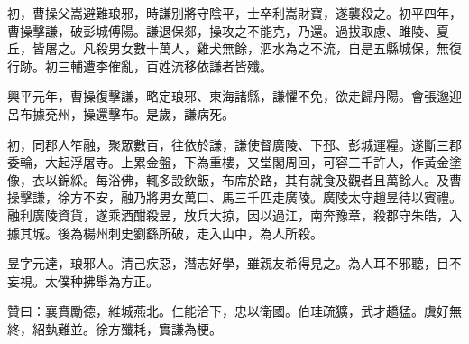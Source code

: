\begin{pinyinscope}
初，曹操父嵩避難琅邪，時謙別將守陰平，士卒利嵩財寶，遂襲殺之。初平四年，曹操擊謙，破彭城傅陽。謙退保郯，操攻之不能克，乃還。過拔取慮、雎陵、夏丘，皆屠之。凡殺男女數十萬人，雞犬無餘，泗水為之不流，自是五縣城保，無復行跡。初三輔遭李傕亂，百姓流移依謙者皆殲。

興平元年，曹操復擊謙，略定琅邪、東海諸縣，謙懼不免，欲走歸丹陽。會張邈迎呂布據兗州，操還擊布。是歲，謙病死。

初，同郡人笮融，聚眾數百，往依於謙，謙使督廣陵、下邳、彭城運糧。遂斷三郡委輪，大起浮屠寺。上累金盤，下為重樓，又堂閣周回，可容三千許人，作黃金塗像，衣以錦綵。每浴佛，輒多設飲飯，布席於路，其有就食及觀者且萬餘人。及曹操擊謙，徐方不安，融乃將男女萬口、馬三千匹走廣陵。廣陵太守趙昱待以賓禮。融利廣陵資貨，遂乘酒酣殺昱，放兵大掠，因以過江，南奔豫章，殺郡守朱皓，入據其城。後為楊州刺史劉繇所破，走入山中，為人所殺。

昱字元達，琅邪人。清己疾惡，潛志好學，雖親友希得見之。為人耳不邪聽，目不妄視。太僕种拂舉為方正。

贊曰：襄賁勵德，維城燕北。仁能洽下，忠以衛國。伯珪疏獷，武才趫猛。虞好無終，紹埶難並。徐方殲耗，實謙為梗。


\end{pinyinscope}